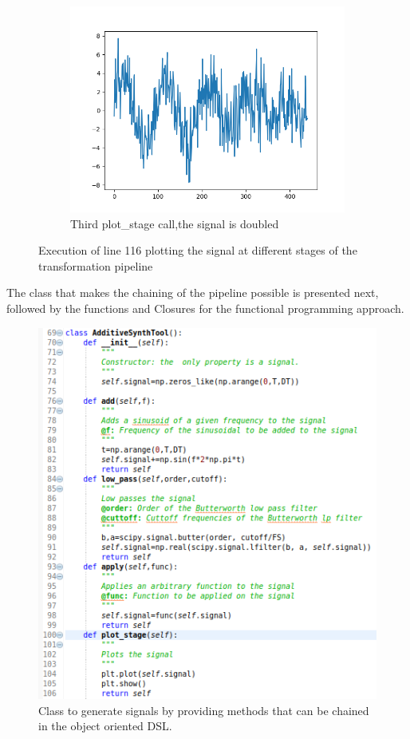 \documentclass[margin,line,a4paper,authoryear,12pt]{report}
\begin{document}
\begin{figure}[h!]
\begin{subfigure}{0.3\linewidth}
        \centering
        \includegraphics[width=\linewidth]{oop_two_sines_noise_times_2.png}
        \caption{Third plot\_stage call,the signal is doubled  }
        \label{fig:SonarCloud}
    \end{subfigure}
    \caption{Execution of line 116 plotting the signal at different stages of the transformation pipeline}
\end{figure}

The class that makes the chaining of the pipeline possible is presented next, followed by the functions and Closures for the functional programming approach.
\begin{figure}[h!]
    \centering
    \includegraphics[width=0.8\linewidth]{dsl_class_snippet.png}
    \caption{ Class to generate signals by providing methods that can be chained in the object oriented DSL.}
    \label{fig:dsl_class}
\end{figure}
\end{document}
